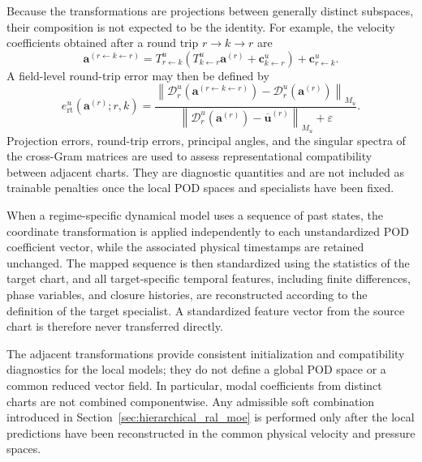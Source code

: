 Because the transformations are projections between generally distinct
subspaces, their composition is not expected to be the identity.  For
example, the velocity coefficients obtained after a round trip
$r\to k\to r$ are
\begin{equation}
  \boldsymbol{a}^{(r\leftarrow k\leftarrow r)}
  =
  T^u_{r\leftarrow k}
  \left(
    T^u_{k\leftarrow r}\boldsymbol{a}^{(r)}
    +\boldsymbol{c}^u_{k\leftarrow r}
  \right)
  +\boldsymbol{c}^u_{r\leftarrow k}.
  \label{eq:velocity_round_trip_map}
\end{equation}
A field-level round-trip error may then be defined by
\begin{equation}
  e_{\mathrm{rt}}^u
  \left(
    \boldsymbol{a}^{(r)};r,k
  \right)
  =
  \frac{
    \left\|
      \mathcal{D}_r^u
      \left(
        \boldsymbol{a}^{(r\leftarrow k\leftarrow r)}
      \right)
      -
      \mathcal{D}_r^u
      \left(
        \boldsymbol{a}^{(r)}
      \right)
    \right\|_{M_u}
  }{
    \left\|
      \mathcal{D}_r^u
      \left(
        \boldsymbol{a}^{(r)}
      \right)
      -
      \overline{\boldsymbol{u}}^{(r)}
    \right\|_{M_u}
    +\varepsilon
  }.
  \label{eq:velocity_round_trip_error}
\end{equation}
Projection errors, round-trip errors, principal angles, and the singular
spectra of the cross-Gram matrices are used to assess representational
compatibility between adjacent charts.  They are diagnostic quantities and
are not included as trainable penalties once the local POD spaces and
specialists have been fixed.

When a regime-specific dynamical model uses a sequence of past states, the
coordinate transformation is applied independently to each unstandardized
POD coefficient vector, while the associated physical timestamps are
retained unchanged.  The mapped sequence is then standardized using the
statistics of the target chart, and all target-specific temporal features,
including finite differences, phase variables, and closure histories, are
reconstructed according to the definition of the target specialist.  A
standardized feature vector from the source chart is therefore never
transferred directly.

The adjacent transformations provide consistent initialization and
compatibility diagnostics for the local models; they do not define a global
POD space or a common reduced vector field.  In particular, modal
coefficients from distinct charts are not combined componentwise.  Any
admissible soft combination introduced in
Section~\ref{sec:hierarchical_ral_moe} is performed only after the local
predictions have been reconstructed in the common physical velocity and
pressure spaces.


